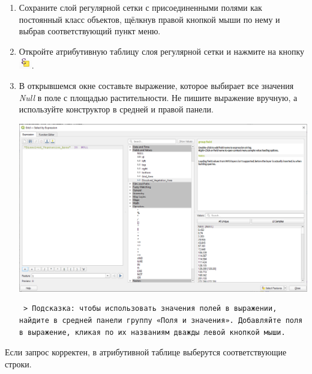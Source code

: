 \documentclass[
  12pt,
]{book}
\begin{document}
\begin{enumerate}
\def\labelenumi{\arabic{enumi}.}
\item
  Сохраните слой регулярной сетки с присоединенными полями как постоянный класс объектов, щёлкнув правой кнопкой мыши по нему и выбрав соответствующий пункт меню.
\item
  Откройте атрибутивную таблицу слоя регулярной сетки и нажмите на кнопку \includegraphics{images/Ex06_SpatRelations/Selection.png}.
\item
  В открывшемся окне составьте выражение, которое выбирает все значения \emph{Null} в поле с площадью растительности. Не пишите выражение вручную, а используйте конструктор в средней и правой панели.

  \includegraphics{images/Ex06_SpatRelations/Select_by_Expression.png}

\begin{verbatim}
 > Подсказка: чтобы использовать значения полей в выражении, найдите в средней панели группу «Поля и значения». Добавляйте поля в выражение, кликая по их названиям дважды левой кнопкой мыши.
\end{verbatim}
\end{enumerate}

Если запрос корректен, в атрибутивной таблице выберутся соответствующие строки.
\end{document}
